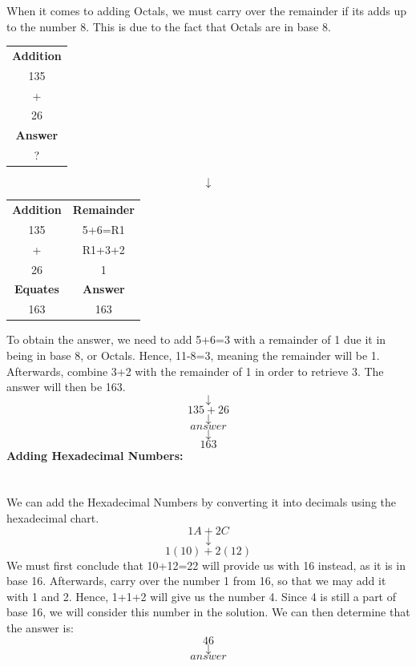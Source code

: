 \documentclass{article}
\begin{document}
When it comes to adding Octals, we must carry over the remainder if its adds up to the number 8. This is due to the fact that Octals are in base 8.
\newline
\begin{table}[h!]
    \centering
    \begin{tabular}{|c|}
    \hline
        \textbf{Addition} \\
        135  \\
        +  \\
        26   \\
        \hline
               \textbf{Answer} \\
        ?  \\ 
        \hline
    \end{tabular}
    \label{tab:my_label}
\end{table}
$$\downarrow$$
\begin{table}[h!]
    \centering
    \begin{tabular}{|c|c|}
    \hline
        \textbf{Addition} & \textbf{Remainder}  \\
        135 & 5+6=R1 \\
        +  & R1+3+2 \\
        26 & 1 \\
        \hline
               \textbf{Equates} & \textbf{Answer}\\
        163 & 163 \\ 
        \hline
    \end{tabular}
    \label{tab:my_label}
\end{table}
\newline
To obtain the answer, we need to add 5+6=3 with a remainder of 1 due it in being in base 8, or Octals. Hence, 11-8=3, meaning the remainder will be 1. Afterwards, combine 3+2 with the remainder of 1 in order to retrieve 3. The answer will then be 163.
$$\downarrow$$
$$135+26$$
$$\downarrow$$
$$answer$$
$$\downarrow$$
$$163$$
\newpage
\textbf{Adding Hexadecimal Numbers:}
\section*{}
We can add the Hexadecimal Numbers by converting it into decimals using the hexadecimal chart.
\newline
$$1A+2C$$
$$\downarrow$$
$$1(10)+2(12)$$
\newline
We must first conclude that 10+12=22 will provide us with 16 instead, as it is in base 16. Afterwards, carry over the number 1 from 16, so that we may add it with 1 and 2. Hence, 1+1+2 will give us the number 4. Since 4 is still a part of base 16, we will consider this number in the solution. We can then determine that the answer is:
$$46$$
$$\downarrow$$
$$answer$$
\newline
\end{document}
